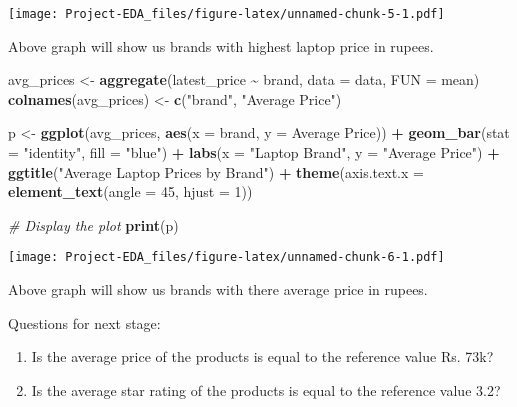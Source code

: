 \documentclass[
]{article}
\newenvironment{Shaded}{\begin{snugshade}}{\end{snugshade}}
\newcommand{\AttributeTok}[1]{\textcolor[rgb]{0.13,0.29,0.53}{#1}}
\newcommand{\CommentTok}[1]{\textcolor[rgb]{0.56,0.35,0.01}{\textit{#1}}}
\newcommand{\DecValTok}[1]{\textcolor[rgb]{0.00,0.00,0.81}{#1}}
\newcommand{\FunctionTok}[1]{\textcolor[rgb]{0.13,0.29,0.53}{\textbf{#1}}}
\newcommand{\NormalTok}[1]{#1}
\newcommand{\OtherTok}[1]{\textcolor[rgb]{0.56,0.35,0.01}{#1}}
\newcommand{\SpecialCharTok}[1]{\textcolor[rgb]{0.81,0.36,0.00}{\textbf{#1}}}
\newcommand{\StringTok}[1]{\textcolor[rgb]{0.31,0.60,0.02}{#1}}
\providecommand{\tightlist}{%
  \setlength{\itemsep}{0pt}\setlength{\parskip}{0pt}}
\begin{document}
\texttt{[image: Project-EDA\_files/figure-latex/unnamed-chunk-5-1.pdf]}

Above graph will show us brands with highest laptop price in rupees.

\begin{Shaded}
\begin{Highlighting}[]
\NormalTok{avg\_prices }\OtherTok{\textless{}{-}} \FunctionTok{aggregate}\NormalTok{(latest\_price }\SpecialCharTok{\textasciitilde{}}\NormalTok{ brand, }\AttributeTok{data =}\NormalTok{ data, }\AttributeTok{FUN =}\NormalTok{ mean)}
\FunctionTok{colnames}\NormalTok{(avg\_prices) }\OtherTok{\textless{}{-}} \FunctionTok{c}\NormalTok{(}\StringTok{"brand"}\NormalTok{, }\StringTok{"Average Price"}\NormalTok{)}

\NormalTok{p }\OtherTok{\textless{}{-}} \FunctionTok{ggplot}\NormalTok{(avg\_prices, }\FunctionTok{aes}\NormalTok{(}\AttributeTok{x =} \StringTok{\textasciigrave{}}\AttributeTok{brand}\StringTok{\textasciigrave{}}\NormalTok{, }\AttributeTok{y =} \StringTok{\textasciigrave{}}\AttributeTok{Average Price}\StringTok{\textasciigrave{}}\NormalTok{)) }\SpecialCharTok{+}
  \FunctionTok{geom\_bar}\NormalTok{(}\AttributeTok{stat =} \StringTok{"identity"}\NormalTok{, }\AttributeTok{fill =} \StringTok{"blue"}\NormalTok{) }\SpecialCharTok{+}
  \FunctionTok{labs}\NormalTok{(}\AttributeTok{x =} \StringTok{"Laptop Brand"}\NormalTok{, }\AttributeTok{y =} \StringTok{"Average Price"}\NormalTok{) }\SpecialCharTok{+}
  \FunctionTok{ggtitle}\NormalTok{(}\StringTok{"Average Laptop Prices by Brand"}\NormalTok{) }\SpecialCharTok{+}
  \FunctionTok{theme}\NormalTok{(}\AttributeTok{axis.text.x =} \FunctionTok{element\_text}\NormalTok{(}\AttributeTok{angle =} \DecValTok{45}\NormalTok{, }\AttributeTok{hjust =} \DecValTok{1}\NormalTok{))}

\CommentTok{\# Display the plot}
\FunctionTok{print}\NormalTok{(p)}
\end{Highlighting}
\end{Shaded}

\texttt{[image: Project-EDA\_files/figure-latex/unnamed-chunk-6-1.pdf]}

Above graph will show us brands with there average price in rupees.

Questions for next stage:

\begin{enumerate}
\def\labelenumi{\arabic{enumi}.}
\tightlist
\item
  Is the average price of the products is equal to the reference value
  Rs. 73k?
\item
  Is the average star rating of the products is equal to the reference
  value 3.2?
\end{enumerate}
\end{document}
